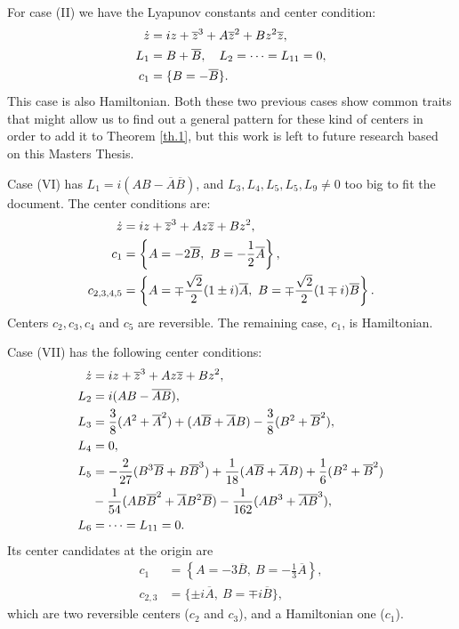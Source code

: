 For case (II) we have the Lyapunov constants and center condition:
\begin{align*}
\dot z &= iz+\overline{z}^3+A\overline{z}^2+Bz^2\overline{z},\\
L_1 &= B+\overline B,\quad L_2=\cdots=L_{11}=0,\\
c_1 &= \{B=-\overline B\}.
\end{align*}
This case is also Hamiltonian. Both these two previous cases show common traits that might allow us to find out a general pattern for these kind of centers in order to add it to Theorem \ref{th.1}, but this work is left to future research based on this Masters Thesis.

Case (VI) has $L_1=i(AB-\overline{A}\overline{B})$, and $L_3,L_4,L_5,L_5,L_9\ne0$ too big to fit the document. The center conditions are:
\begin{align*}
\dot z &= iz+\overline{z}^3+Az\overline{z}+Bz^2,\\
c_1&=\left\{A=-2\overline B,~B=-\frac{1}{2}\overline A\right\},\\
c_{2,3,4,5}&=\left\{A=\mp \frac{\sqrt{2}}{2}(1\pm i)\overline A,~B=\mp\frac{\sqrt{2}}{2}(1\mp i)\overline B\right\}.
\end{align*}
Centers $c_2,c_3,c_4$ and $c_5$ are reversible. The remaining case, $c_1$, is Hamiltonian.


Case (VII) has the following center conditions:
\begin{align*}
\dot z &= iz+\overline{z}^3+Az\overline{z}+Bz^2,\\
L_2&=i(AB-\overline{A}\overline{B}),\\
L_3&=\frac{3}{8}(A^2+\overline A^2)+(A\overline B+\overline AB)-\frac{3}{8}(B^2+\overline B^2),\\
L_4&=0,\\
L_5&=-\frac{2}{27}(B^3\overline B+B\overline B^3)+\frac{1}{18}(A\overline B+\overline AB)+\frac{1}{6}(B^2+\overline B^2)\\
&-\frac{1}{54}(AB\overline B^2+\overline AB^2\overline B)-\frac{1}{162}(AB^3+\overline A\overline B^3),\\
L_6&=\cdots=L_{11}=0.
\end{align*}
Its center candidates at the origin are
\begin{align*}
c_1&=\left\{A=-3\overline B,~B=-\frac{1}{3}\overline A\right\},\\
c_{2,3}&=\{\pm i\overline A,~B=\mp i\overline B\},
\end{align*}
which are two reversible centers ($c_2$ and $c_3$), and a Hamiltonian one ($c_1$).



